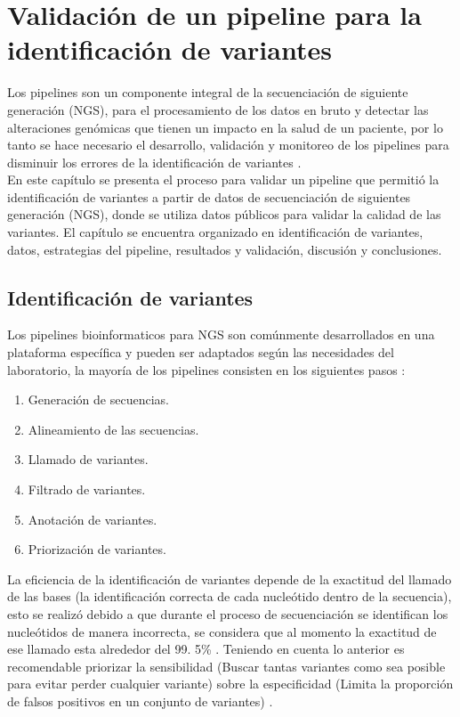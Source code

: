 \chapter{Validación de un pipeline para la identificación de variantes}

Los pipelines son un componente integral de la secuenciación de siguiente generación (NGS), para el procesamiento de los datos en bruto y detectar las alteraciones genómicas que tienen un impacto en la salud de un paciente, por lo tanto se hace necesario el desarrollo, validación y monitoreo de los pipelines  para disminuir los errores de la identificación de variantes \cite{Roy2018}. \\

En este capítulo se presenta el proceso para validar un pipeline que permitió la  identificación de variantes a partir de datos de secuenciación de siguientes generación (NGS), donde se utiliza datos públicos para validar la calidad  de las variantes. El capítulo se encuentra organizado en identificación de variantes, datos, estrategias del pipeline, resultados y validación, discusión y conclusiones. 

\section{Identificación de variantes}

Los pipelines bioinformaticos para NGS son comúnmente desarrollados en una plataforma específica y pueden ser adaptados según las necesidades del laboratorio, la mayoría de los pipelines consisten en los siguientes pasos \cite{Roy2018}:

\begin{enumerate}[1.]
	\item Generación de secuencias. 
	\item Alineamiento de las secuencias. 
	\item Llamado de variantes. 
	\item Filtrado de variantes. 
	\item Anotación de variantes. 
	\item Priorización de variantes. 
\end{enumerate}
 
La eficiencia de la identificación de variantes depende de la exactitud del llamado de las bases (la identificación correcta de cada nucleótido dentro de la secuencia), esto se realizó debido a que durante el proceso de secuenciación  se identifican los nucleótidos de manera incorrecta, se considera que al momento la exactitud de ese llamado esta alrededor del 99. 5\% \cite{Tetreault2015}. Teniendo en cuenta lo anterior es recomendable  priorizar la sensibilidad (Buscar tantas variantes como sea posible para evitar perder cualquier variante) sobre la especificidad (Limita la proporción de falsos positivos en un conjunto de variantes) \cite{Auwera2014}.  \\

